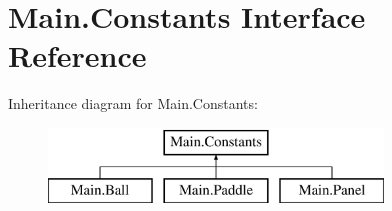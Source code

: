 \hypertarget{interface_main_1_1_constants}{}\section{Main.\+Constants Interface Reference}
\label{interface_main_1_1_constants}
Inheritance diagram for Main.\+Constants\+:\begin{figure}[H]
\begin{center}
\leavevmode
\includegraphics[height=2.000000cm]{interface_main_1_1_constants}
\end{center}
\end{figure}
